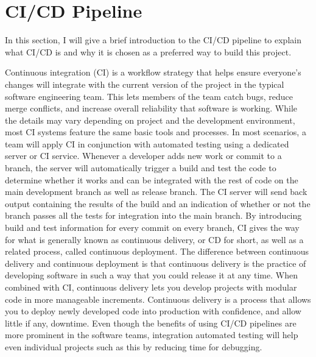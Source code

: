 \section{CI/CD Pipeline} \label{sec:cicd}
In this section, I will give a brief introduction to the CI/CD pipeline to explain what CI/CD is and why it is chosen as a preferred way to build this project.

Continuous integration (CI) is a workflow strategy that helps ensure everyone's changes will integrate with the current version of the project in the typical software engineering team. This lets members of the team catch bugs, reduce merge conflicts, and increase overall reliability that software is working. While the details may vary depending on project and the development environment, most CI systems feature the same basic tools and processes. In most scenarios, a team will apply CI in conjunction with automated testing using a dedicated server or CI service. Whenever a developer adds new work or commit to a branch, the server will automatically trigger a build and test the code to determine whether it works and can be integrated with the rest of code on the main development branch as well as release branch. The CI server will send back output containing the results of the build and an indication of whether or not the branch passes all the tests for integration into the main branch. By introducing build and test information for every commit on every branch, CI gives the way for what is generally known as continuous delivery, or CD for short, as well as a related process, called continuous deployment. The difference between continuous delivery and continuous deployment is that continuous delivery is the practice of developing software in such a way that you could release it at any time. When combined with CI, continuous delivery lets you develop projects with modular code in more manageable increments. 
Continuous delivery is a process that allows you to deploy newly developed code into production with confidence, and allow little if any, downtime. Even though the benefits of using CI/CD pipelines are more prominent in the software teams, integration automated testing will help even individual projects such as this by reducing time for debugging.

